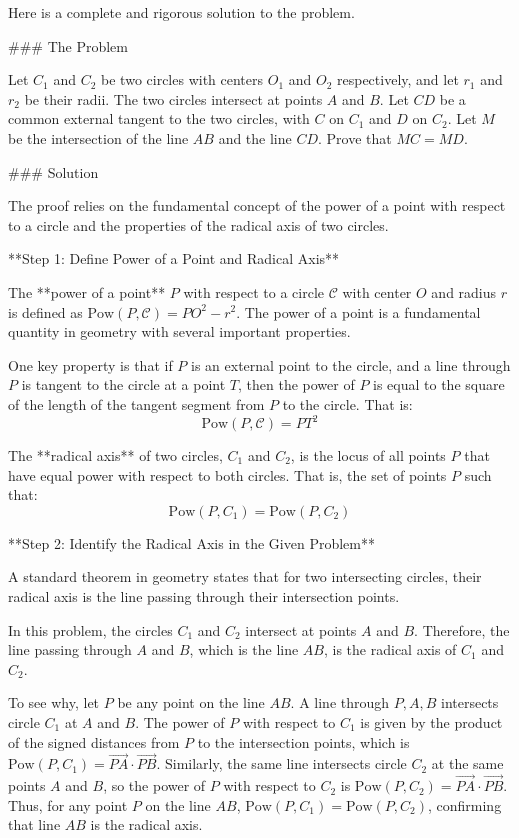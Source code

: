 Here is a complete and rigorous solution to the problem.

### The Problem

Let $C_1$ and $C_2$ be two circles with centers $O_1$ and $O_2$ respectively, and let $r_1$ and $r_2$ be their radii. The two circles intersect at points $A$ and $B$. Let $CD$ be a common external tangent to the two circles, with $C$ on $C_1$ and $D$ on $C_2$. Let $M$ be the intersection of the line $AB$ and the line $CD$. Prove that $MC = MD$.

### Solution

The proof relies on the fundamental concept of the power of a point with respect to a circle and the properties of the radical axis of two circles.

**Step 1: Define Power of a Point and Radical Axis**

The **power of a point** $P$ with respect to a circle $\mathcal{C}$ with center $O$ and radius $r$ is defined as $\text{Pow}(P, \mathcal{C}) = PO^2 - r^2$. The power of a point is a fundamental quantity in geometry with several important properties.

One key property is that if $P$ is an external point to the circle, and a line through $P$ is tangent to the circle at a point $T$, then the power of $P$ is equal to the square of the length of the tangent segment from $P$ to the circle. That is:
$$ \text{Pow}(P, \mathcal{C}) = PT^2 $$

The **radical axis** of two circles, $C_1$ and $C_2$, is the locus of all points $P$ that have equal power with respect to both circles. That is, the set of points $P$ such that:
$$ \text{Pow}(P, C_1) = \text{Pow}(P, C_2) $$

**Step 2: Identify the Radical Axis in the Given Problem**

A standard theorem in geometry states that for two intersecting circles, their radical axis is the line passing through their intersection points.

In this problem, the circles $C_1$ and $C_2$ intersect at points $A$ and $B$. Therefore, the line passing through $A$ and $B$, which is the line $AB$, is the radical axis of $C_1$ and $C_2$.

To see why, let $P$ be any point on the line $AB$. A line through $P, A, B$ intersects circle $C_1$ at $A$ and $B$. The power of $P$ with respect to $C_1$ is given by the product of the signed distances from $P$ to the intersection points, which is $\text{Pow}(P, C_1) = \vec{PA} \cdot \vec{PB}$. Similarly, the same line intersects circle $C_2$ at the same points $A$ and $B$, so the power of $P$ with respect to $C_2$ is $\text{Pow}(P, C_2) = \vec{PA} \cdot \vec{PB}$. Thus, for any point $P$ on the line $AB$, $\text{Pow}(P, C_1) = \text{Pow}(P, C_2)$, confirming that line $AB$ is the radical axis.


